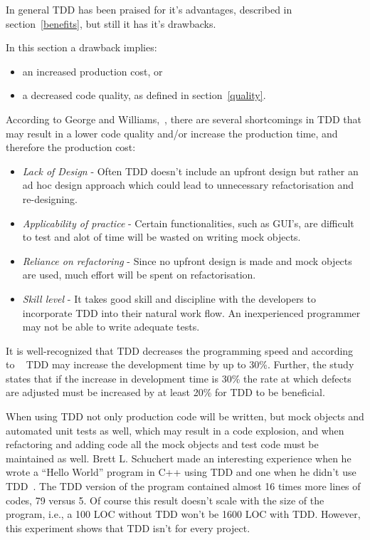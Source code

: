 In general TDD has been praised for it's advantages, described in section~\ref{benefits}, but still it has it's drawbacks. 

In this section a drawback implies:
\begin{itemize}
\item an increased production cost, or
\item a decreased code quality, as defined in section~\ref{quality}.
\end{itemize}		

\noindent According to George and Williams,~\cite{georgeandwilliams}, there are several shortcomings in TDD that may result in a lower code quality and/or increase the production time, and therefore the production cost:
\begin{itemize}
 \item \textit{Lack of Design} - Often TDD doesn't include an upfront design but rather an ad hoc design approach which could lead to unnecessary refactorisation and re-designing. 
 \item \textit{Applicability of practice} - Certain functionalities, such as GUI's, are difficult to test and alot of time will be wasted on writing mock objects.
 \item \textit{Reliance on refactoring} - Since no upfront design is made and mock objects are used, much effort will be spent on refactorisation.
 \item \textit{Skill level} - It takes good skill and discipline with the developers to incorporate TDD into their natural work flow. An inexperienced programmer may not be able to write adequate tests.
\end{itemize}

\noindent It is well-recognized that TDD decreases the programming speed and according to ~\cite{microsoftibm} TDD may increase the development time by up to 30\%. 
Further, the study~\cite{tddroi} states that if the increase in development time is 30\% the rate at which defects are adjusted must be increased by at least 20\% for TDD to be beneficial.

When using TDD not only production code will be written, but mock objects and automated unit tests as well, which may result in a code explosion, and when refactoring and adding code all the mock objects and test code must be maintained as well. Brett L. Schuchert made an interesting experience when he wrote a ``Hello World'' program in C++ using TDD and one when he didn't use TDD~\cite{helloworld}. 
The TDD version of the program contained almost 16 times more lines of codes, 79 versus 5. Of course this result doesn't scale with the size of the program, i.e., a 100 LOC without TDD won't be 1600 LOC with TDD. However, this experiment shows that TDD isn't for every project.